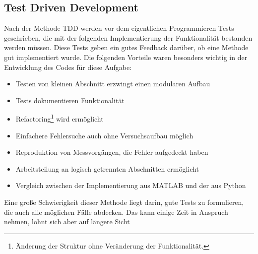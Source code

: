 \documentclass[../Report.tex]{subfiles}
\begin{document}
\subsection{Test Driven Development}
\label{subsec:code.tdd}
Nach der Methode TDD werden vor dem eigentlichen Programmieren Tests geschrieben, die mit der folgenden Implementierung der Funktionalität bestanden werden müssen. Diese Tests geben ein gutes Feedback darüber, ob eine Methode gut implementiert wurde. Die folgenden Vorteile waren besonders wichtig in der Entwicklung des Codes für diese Aufgabe:
\begin{itemize}
	\item Testen von kleinen Abschnitt erzwingt einen modularen Aufbau
	\item Tests dokumentieren Funktionalität
	\item Refactoring\footnote{Änderung der Struktur ohne Veränderung der Funktionalität.} wird ermöglicht
	\item Einfachere Fehlersuche auch ohne Versuchsaufbau möglich
	\item Reproduktion von Messvorgängen, die Fehler aufgedeckt haben
	\item Arbeitsteilung an logisch getrennten Abschnitten ermöglicht
	\item Vergleich zwischen der Implementierung aus MATLAB und der aus Python
\end{itemize}
Eine große Schwierigkeit dieser Methode liegt darin, gute Tests zu formulieren, die auch alle möglichen Fälle abdecken. Das kann einige Zeit in Anspruch nehmen, lohnt sich aber auf längere Sicht
\end{document}
